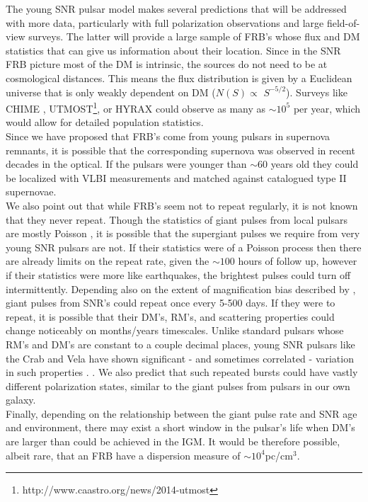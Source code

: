 \documentclass[useAMS,usenatbib]{emulateapj}
\begin{document}
The young SNR pulsar model makes several predictions that will
be addressed with more data, particularly with full polarization 
observations and large field-of-view surveys. 
The latter will provide a large sample of FRB's whose flux and DM statistics
that can give us information about their location. Since in the SNR FRB picture
most of the DM is intrinsic, the sources do not need to be at cosmological 
distances. This means the flux distribution is given by a Euclidean universe
that is only weakly dependent on DM ($N(S) \propto$ $S^{-5/2}$). Surveys
like CHIME \citep{2014SPIE.9145E..22B}, 
UTMOST\footnote{http://www.caastro.org/news/2014-utmost},
 or HYRAX could observe as many as $\sim10^5$
per year, which would allow for detailed population statistics.
\\
Since we have proposed that FRB's come from young pulsars 
in supernova remnants, it is possible that the corresponding 
supernova was observed in recent decades in the optical. If the pulsars
were younger than $\sim$60 years old they could be localized with VLBI
measurements and matched against catalogued type II supernovae. 
\\
We also point out that while FRB's seem not to repeat regularly, 
it is not known that they never repeat. Though the statistics 
of giant pulses from local pulsars are mostly Poisson \citep{1999ApJ...517..460S},
it is possible that 
the supergiant pulses we require from very young SNR pulsars are not. If their 
statistics were of a Poisson process then there are already limits on the repeat rate, 
given the $\sim100$ hours of follow up, however if their statistics were more like
earthquakes, the brightest pulses could turn off intermittently. 
Depending also on the extent of
magnification bias described by \cite{2014ApJ...789L..26P}, giant pulses
from SNR's could repeat once every 5-500 days. 
If they were to repeat,
it is possible that their DM's, RM's, and scattering properties could 
change noticeably on months/years timescales. Unlike standard pulsars 
whose RM's and DM's are constant to a couple decimal places, young 
SNR pulsars like the Crab and Vela have shown significant - and sometimes
correlated - variation in such properties \citep{1988A&A...202..166R, 2008A&A...483...13K}.
. We also predict that such repeated 
bursts could have vastly different polarization states, similar to the giant 
pulses from pulsars in our own galaxy.
\\
Finally, depending on the relationship between the giant pulse rate and SNR
age and environment, there may exist a short window in the pulsar's life when 
DM's are larger than could be achieved in the IGM. It would be therefore 
possible, albeit rare, that an FRB have a dispersion
 measure of $\sim10^4$pc/cm$^3$.
\end{document}
